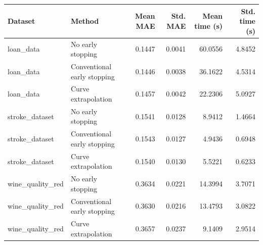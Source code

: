 \begin{tabular}{llrrrr}
\toprule
Dataset & Method & Mean MAE & Std. MAE & Mean time (s) & Std. time (s) \\
\midrule
loan_data & No early stopping & 0.1447 & 0.0041 & 60.0556 & 4.8452 \\
loan_data & Conventional early stopping & 0.1446 & 0.0038 & 36.1622 & 4.5314 \\
loan_data & Curve extrapolation & 0.1457 & 0.0042 & 22.2306 & 5.0927 \\
stroke_dataset & No early stopping & 0.1541 & 0.0128 & 8.9412 & 1.4664 \\
stroke_dataset & Conventional early stopping & 0.1543 & 0.0127 & 4.9436 & 0.6948 \\
stroke_dataset & Curve extrapolation & 0.1540 & 0.0130 & 5.5221 & 0.6233 \\
wine_quality_red & No early stopping & 0.3634 & 0.0221 & 14.3994 & 3.7071 \\
wine_quality_red & Conventional early stopping & 0.3630 & 0.0216 & 13.4793 & 3.0822 \\
wine_quality_red & Curve extrapolation & 0.3657 & 0.0237 & 9.1409 & 2.9514 \\
\bottomrule
\end{tabular}
